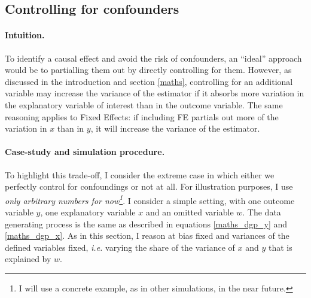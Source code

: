 \documentclass[usletter, 12pt]{article}
\begin{document}
		
		
		 \subsection{Controlling for confounders}
		
     			\paragraph{Intuition.} To identify a causal effect and avoid the risk of confounders, an ``ideal'' approach would be to partialling them out by directly controlling for them. %
			However, as discussed in the introduction and section \ref{maths}, controlling for an additional variable may increase the variance of the estimator if it absorbs more variation in the explanatory variable of interest than in the outcome variable.
			The same reasoning applies to Fixed Effects: if including FE partials out more of the variation in $x$ than in $y$, it will increase the variance of the estimator.
			
			\paragraph{Case-study and simulation procedure.} To highlight this trade-off, I consider the extreme case in which either we perfectly control for confoundings or not at all. For illustration purposes, I use \textit{only arbitrary numbers for now\footnote{I will use a concrete example, as in other simulations, in the near future.}}. I consider a simple setting, with one outcome variable $y$, one explanatory variable $x$ and an omitted variable $w$. The data generating process is the same as described in equations \ref{maths_dgp_y} and \ref{maths_dgp_x}. As in this section, I reason at bias fixed and variances of the defined variables fixed, \textit{i.e.} varying the share of the variance of $x$ and $y$ that is explained by $w$.
			
\end{document}

